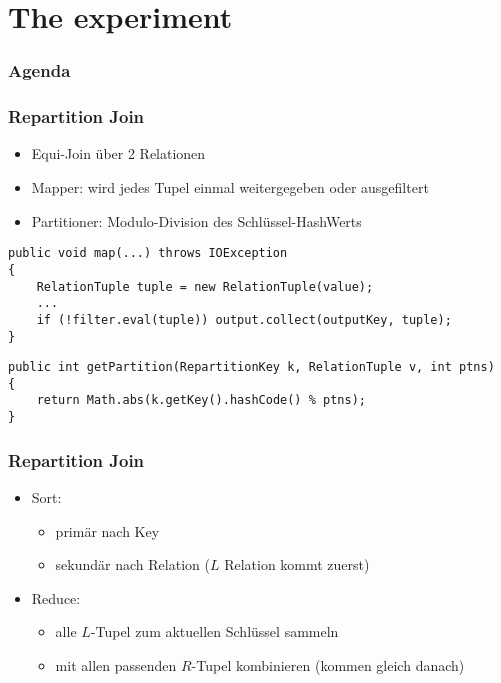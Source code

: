 \section{The experiment}

\begin{frame}
\frametitle{Agenda}
\tableofcontents[currentsection]
\end{frame}

\begin{frame}[fragile]
\frametitle{Repartition Join}
\begin{itemize}
  \item Equi-Join über 2 Relationen
  \item Mapper: wird jedes Tupel einmal weitergegeben oder ausgefiltert
  \item Partitioner: Modulo-Division des Schlüssel-HashWerts
\end{itemize}

\scriptsize{
\begin{lstlisting}
public void map(...) throws IOException 
{
    RelationTuple tuple = new RelationTuple(value);
    ...
    if (!filter.eval(tuple)) output.collect(outputKey, tuple);
}
\end{lstlisting}

\begin{lstlisting}
public int getPartition(RepartitionKey k, RelationTuple v, int ptns) 
{
    return Math.abs(k.getKey().hashCode() % ptns);
}
\end{lstlisting}
}
\end{frame}

\begin{frame}[fragile]
\frametitle{Repartition Join}
\begin{itemize}
  \item Sort:
  \begin{itemize} 
    \item primär nach Key 
    \item sekundär nach Relation ($L$ Relation kommt zuerst)
  \end{itemize}
  \item Reduce:
  \begin{itemize}
    \item alle $L$-Tupel zum aktuellen Schlüssel sammeln
    \item mit allen passenden $R$-Tupel kombinieren (kommen gleich danach)
  \end{itemize}
\end{itemize}
\end{frame}

